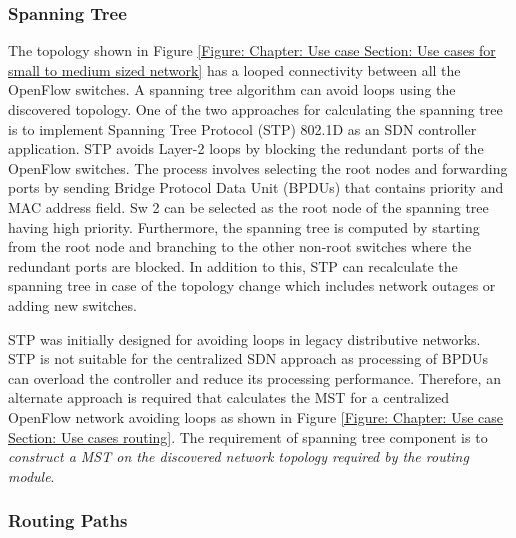 \subsubsection{Spanning Tree}
\label{Chapter: Use cases and Requirements:Section: Routing Requirements: Subsection: Spanning Tree}

The topology shown in Figure \ref{Figure: Chapter: Use case Section: Use cases for small to medium sized network} has a looped connectivity between all the OpenFlow switches. A spanning tree algorithm can avoid loops using the discovered topology. One of the two approaches for calculating the spanning tree is to implement Spanning Tree Protocol (STP) 802.1D as an SDN controller application. STP avoids Layer-2 loops by blocking the redundant ports of the OpenFlow switches. The process involves selecting the root nodes and forwarding ports by sending Bridge Protocol Data Unit (BPDUs) that contains priority and MAC address field. Sw 2 can be selected as the root node of the spanning tree having high priority. Furthermore, the spanning tree is computed by starting from the root node and branching to the other non-root switches where the redundant ports are blocked. In addition to this, STP can recalculate the spanning tree in case of the topology change which includes network outages or adding new switches.

STP was initially designed for avoiding loops in legacy distributive networks. STP is not suitable for the centralized SDN approach as processing of BPDUs can overload the controller and reduce its processing performance. Therefore, an alternate approach is required that calculates the MST for a centralized OpenFlow network avoiding loops as shown in Figure \ref{Figure: Chapter: Use case Section: Use cases routing}. The requirement of spanning tree component is to \textit{construct a MST on the discovered network topology required by the routing module}.

\subsubsection{Routing Paths}

